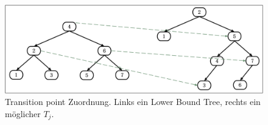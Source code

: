 \documentclass[a4paper,12pt]{article}
\begin{document}
\begin{figure}[H]
	\centering
	\includegraphics[width=1\textwidth]{Medien/Tango/transitionPoints}
	\caption{Transition point Zuordnung. Links ein Lower Bound Tree, rechts ein möglicher $T_j$.   }
	\label{fig:transitionPoints}
\end{figure}
\end{document}
